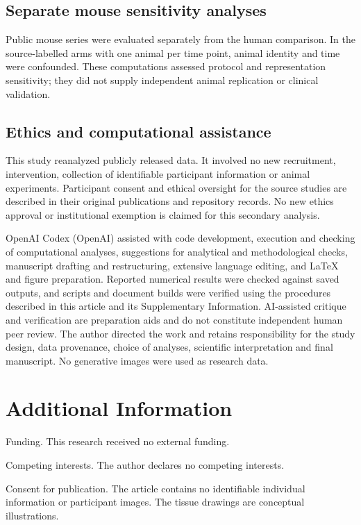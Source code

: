 \documentclass[10pt,a4paper]{article}
\begin{document}
\subsection{Separate mouse sensitivity analyses}
Public mouse series were evaluated separately from the human comparison. In the source-labelled arms with one animal per time point, animal identity and time were confounded. These computations assessed protocol and representation sensitivity; they did not supply independent animal replication or clinical validation.

\subsection{Ethics and computational assistance}
This study reanalyzed publicly released data. It involved no new recruitment, intervention, collection of identifiable participant information or animal experiments. Participant consent and ethical oversight for the source studies are described in their original publications and repository records. No new ethics approval or institutional exemption is claimed for this secondary analysis.

OpenAI Codex (OpenAI) assisted with code development, execution and checking of computational analyses, suggestions for analytical and methodological checks, manuscript drafting and restructuring, extensive language editing, and LaTeX and figure preparation. Reported numerical results were checked against saved outputs, and scripts and document builds were verified using the procedures described in this article and its Supplementary Information. AI-assisted critique and verification are preparation aids and do not constitute independent human peer review. The author directed the work and retains responsibility for the study design, data provenance, choice of analyses, scientific interpretation and final manuscript. No generative images were used as research data.

\section*{Additional Information}
Funding. This research received no external funding.

Competing interests. The author declares no competing interests.





Consent for publication. The article contains no identifiable individual information or participant images. The tissue drawings are conceptual illustrations.
\end{document}
